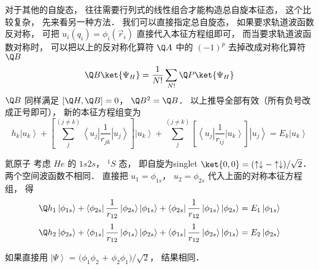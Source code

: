 对于其他的自旋态， 往往需要行列式的线性组合才能构造总自旋本征态， 这个比较复杂， 先来看另一种方法． 我们可以直接指定总自旋态， 如果要求轨道波函数反对称， 可把 ${u_i}({q_i}) = {\phi_i}({\vec r_i})$ 直接代入本征方程组即可， 而当要求轨道波函数对称时， 可以把以上的反对称化算符 $\Q A$ 中的 ${( - 1)^p}$ 去掉改成对称化算符 $\Q B$ 
 \begin{equation}
\Q B \ket{{\Psi_H}}  = \frac{1}{{N!}}\sum\limits_{N!} {\Q P\ket{{\Psi_H}} } 
\end{equation}
 $\Q B$ 同样满足 $[\Q H,\Q B] = 0$，  ${\Q B^2} = \Q B$．  以上推导全部有效（所有负号改成正号即可）， 新的本征方程组变为
 \begin{equation}
{h_k}\left| {{u_k}} \right\rangle  + \left[ {\sum\limits_j^{(j \ne k)} {\left\langle {{u_j}} \right|\frac{1}{{{r_{jk}}}}\left| {{u_j}} \right\rangle } } \right]\left| {{u_k}} \right\rangle  + \sum\limits_j^{(j \ne k)} {\left[ {\left\langle {{u_j}} \right|\frac{1}{{{r_{ij}}}}\left| {{u_k}} \right\rangle } \right]\left| {{u_j}} \right\rangle }  = {E_k}\left| {{u_k}} \right\rangle 
\end{equation}

\begin{exam}{氦原子}
考虑 $He$ 的 $1s2s$，  $^1S$ 态， 即自旋为singlet $\ket{0,0}  = ( \uparrow  \downarrow  -  \uparrow  \downarrow )/\sqrt 2 $．  两个空间波函数不相同． 直接把 ${u_1} = {\phi_{1s}}$，  ${u_2} = {\phi_{2s}}$ 代入上面的对称本征方程组， 得
 \begin{equation}
{\Q h_1}\left| {{\phi_{1s}}} \right\rangle  + \left\langle {{\phi_{2s}}} \right|\frac{1}{{{r_{12}}}}\left| {{\phi_{2s}}} \right\rangle \left| {{\phi_{1s}}} \right\rangle  + \left\langle {{\phi_{2s}}} \right|\frac{1}{{{r_{12}}}}\left| {{\phi_{1s}}} \right\rangle \left| {{\phi_{2s}}} \right\rangle  = {E_1}\left| {{\phi_{1s}}} \right\rangle 
\end{equation}
\begin{equation}
{\Q h_2}\left| {{\phi_{2s}}} \right\rangle  + \left\langle {{\phi_{1s}}} \right|\frac{1}{{{r_{12}}}}\left| {{\phi_{1s}}} \right\rangle \left| {{\phi_{2s}}} \right\rangle  + \left\langle {{\phi_{1s}}} \right|\frac{1}{{{r_{12}}}}\left| {{\phi_{2s}}} \right\rangle \left| {{\phi_{1s}}} \right\rangle  = {E_2}\left| {{\phi_{2s}}} \right\rangle 
\end{equation}
 
如果直接用 $\left| \Psi  \right\rangle {\text{ = (}}{\phi_1}{\phi_2}{\text{ + }}{\phi_2}{\phi_1}{\text{)/}}\sqrt 2 $，  结果相同．
\end{exam}
 
